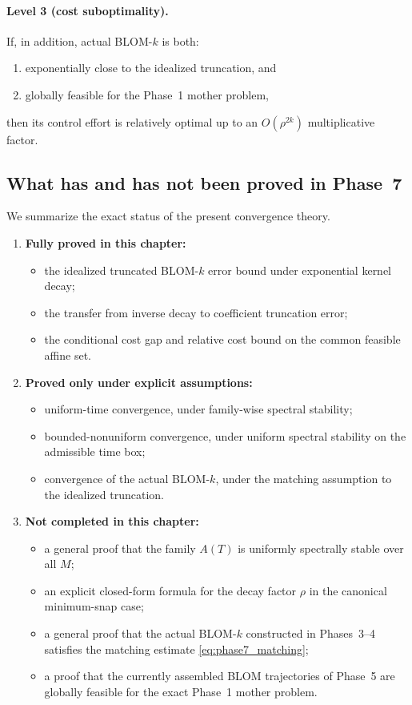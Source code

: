 \paragraph{Level 3 (cost suboptimality).}
If, in addition, actual BLOM-\(k\) is both:
\begin{enumerate}
	\item exponentially close to the idealized truncation, and
	\item globally feasible for the Phase~1 mother problem,
\end{enumerate}
then its control effort is relatively optimal up to an \(O(\rho^{2k})\) multiplicative factor.

\subsection{What has and has not been proved in Phase~7}
\label{subsec:phase7_status}

We summarize the exact status of the present convergence theory.

\begin{enumerate}
	\item \textbf{Fully proved in this chapter:}
	\begin{itemize}
		\item the idealized truncated BLOM-\(k\) error bound under exponential kernel decay;
		\item the transfer from inverse decay to coefficient truncation error;
		\item the conditional cost gap and relative cost bound on the common feasible affine set.
	\end{itemize}
	
	\item \textbf{Proved only under explicit assumptions:}
	\begin{itemize}
		\item uniform-time convergence, under family-wise spectral stability;
		\item bounded-nonuniform convergence, under uniform spectral stability on the admissible time box;
		\item convergence of the actual BLOM-\(k\), under the matching assumption to the idealized truncation.
	\end{itemize}
	
	\item \textbf{Not completed in this chapter:}
	\begin{itemize}
		\item a general proof that the family \(A(T)\) is uniformly spectrally stable over all \(M\);
		\item an explicit closed-form formula for the decay factor \(\rho\) in the canonical minimum-snap case;
		\item a general proof that the actual BLOM-\(k\) constructed in Phases~3--4 satisfies the matching estimate \eqref{eq:phase7_matching};
		\item a proof that the currently assembled BLOM trajectories of Phase~5 are globally feasible for the exact Phase~1 mother problem.
	\end{itemize}
\end{enumerate}


